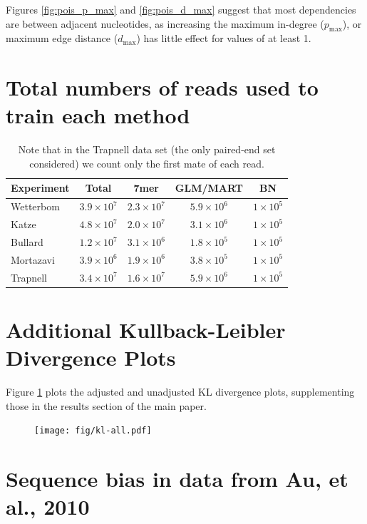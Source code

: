 \documentclass[letterpaper]{article}
\begin{document}
Figures \ref{fig:pois_p_max} and \ref{fig:pois_d_max} suggest that most
dependencies are between adjacent nucleotides, as increasing the maximum
in-degree ($p_{\text{max}}$), or maximum edge distance ($d_{\text{max}}$) has
little effect for values of at least 1.


\section{Total numbers of reads used to train each method}

\begin{table}[H]
\begin{center}
\begin{tabular}{lcccc}
Experiment & Total & 7mer & GLM/MART & BN \\\hline
Wetterbom & $3.9 \times 10^7$ & $2.3 \times 10^7$ & $5.9 \times
10^6$ & $1 \times 10^5$ \\
Katze & $4.8 \times 10^7$ & $2.0 \times 10^7$ & $3.1 \times 10^6$ & $1 \times
10^5$ \\
Bullard & $1.2 \times 10^7$ & $3.1 \times 10^6$ & $1.8 \times 10^5$ & $1 \times
10^5$\\
Mortazavi & $3.9 \times 10^6$ & $1.9 \times 10^6$ & $3.8 \times 10^5$ & $1
\times 10^5$ \\
Trapnell & $3.4 \times 10^7$ & $1.6 \times 10^7$ & $5.9 \times 10^6$ & $1 \times
10^5$
\end{tabular}
\caption{Note that in the Trapnell data set (the only paired-end set considered) we
count only the first mate of each read.}
\label{tab:counts}
\end{center}
\end{table}


\section{Additional Kullback-Leibler Divergence Plots}

Figure \ref{fig:klall} plots the adjusted and unadjusted KL divergence plots,
supplementing those in the results section of the main paper.

\begin{figure}[H]
\centerline{
\texttt{[image: fig/kl-all.pdf]}
}
\caption{}
\label{fig:klall}
\end{figure}


\section{Sequence bias in data from Au, et al., 2010}
\end{document}

